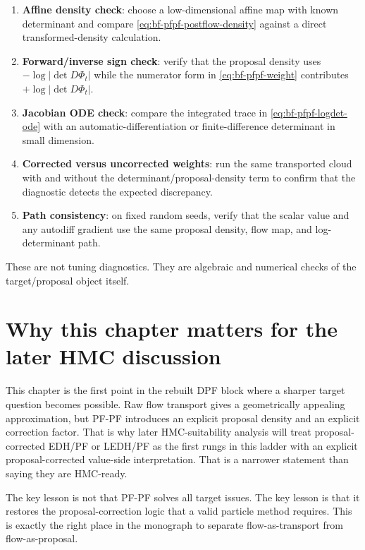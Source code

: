 \begin{enumerate}[label=(\roman*)]
  \item \textbf{Affine density check}: choose a low-dimensional affine map with
    known determinant and compare \eqref{eq:bf-pfpf-postflow-density} against a
    direct transformed-density calculation.
  \item \textbf{Forward/inverse sign check}: verify that the proposal density
    uses $-\log|\det D\Phi_t|$ while the numerator form in
    \eqref{eq:bf-pfpf-weight} contributes $+\log|\det D\Phi_t|$.
  \item \textbf{Jacobian ODE check}: compare the integrated trace in
    \eqref{eq:bf-pfpf-logdet-ode} with an automatic-differentiation or
    finite-difference determinant in small dimension.
  \item \textbf{Corrected versus uncorrected weights}: run the same transported
    cloud with and without the determinant/proposal-density term to confirm that
    the diagnostic detects the expected discrepancy.
  \item \textbf{Path consistency}: on fixed random seeds, verify that the scalar
    value and any autodiff gradient use the same proposal density, flow map, and
    log-determinant path.
\end{enumerate}

These are not tuning diagnostics.  They are algebraic and numerical checks of
the target/proposal object itself.

\section{Why this chapter matters for the later HMC discussion}
\label{sec:bf-pfpf-hmc-bridge}

This chapter is the first point in the rebuilt DPF block where a sharper target
question becomes possible.  Raw flow transport gives a geometrically appealing
approximation, but PF-PF introduces an explicit proposal density and an explicit
correction factor.  That is why later HMC-suitability analysis will treat
proposal-corrected EDH/PF or LEDH/PF as the first rungs in this ladder with an
explicit proposal-corrected value-side interpretation.  That is a narrower
statement than saying they are HMC-ready.

The key lesson is not that PF-PF solves all target issues.  The key lesson is
that it restores the proposal-correction logic that a valid particle method
requires.  This is exactly the right place in the monograph to separate
flow-as-transport from flow-as-proposal.


